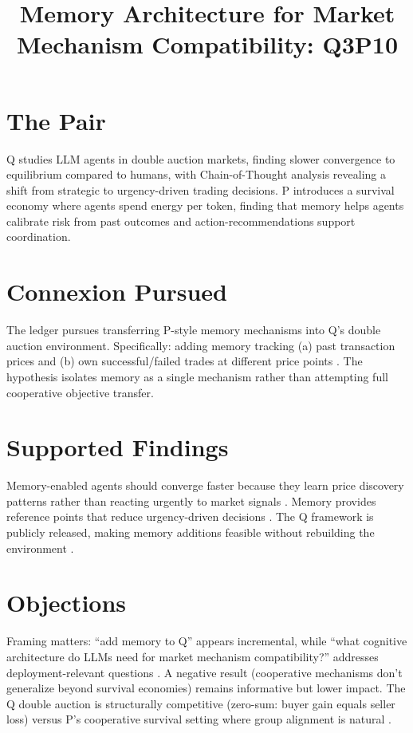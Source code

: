 \documentclass{article}
\title{Memory Architecture for Market Mechanism Compatibility: Q3P10}
\begin{document}
\maketitle

\section*{The Pair}

Q studies LLM agents in double auction markets, finding slower convergence to equilibrium compared to humans, with Chain-of-Thought analysis revealing a shift from strategic to urgency-driven trading decisions. P introduces a survival economy where agents spend energy per token, finding that memory helps agents calibrate risk from past outcomes and action-recommendations support coordination.

\section*{Connexion Pursued}

The ledger pursues transferring P-style memory mechanisms into Q's double auction environment. Specifically: adding memory tracking (a) past transaction prices and (b) own successful/failed trades at different price points . The hypothesis isolates memory as a single mechanism rather than attempting full cooperative objective transfer.

\section*{Supported Findings}

Memory-enabled agents should converge faster because they learn price discovery patterns rather than reacting urgently to market signals . Memory provides reference points that reduce urgency-driven decisions . The Q framework is publicly released, making memory additions feasible without rebuilding the environment .

\section*{Objections}

Framing matters: ``add memory to Q'' appears incremental, while ``what cognitive architecture do LLMs need for market mechanism compatibility?'' addresses deployment-relevant questions . A negative result (cooperative mechanisms don't generalize beyond survival economies) remains informative but lower impact. The Q double auction is structurally competitive (zero-sum: buyer gain equals seller loss) versus P's cooperative survival setting where group alignment is natural .
\end{document}
